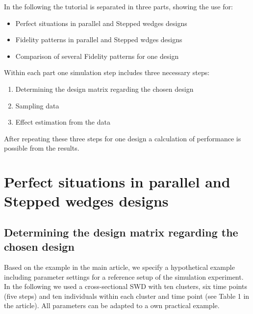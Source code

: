 \documentclass{article}\usepackage[]{graphicx}\usepackage[]{color}
\begin{document}
In the following the tutorial is separated in three parts, showing the use for:

\begin{itemize}
\item Perfect situations in parallel and Stepped wedges designs
\item Fidelity patterns in parallel and Stepped wdges designs
\item Comparison of several Fidelity patterns for one design
\end{itemize}

Within each part one simulation step includes three necessary steps:

\begin{enumerate}
\item Determining the design matrix regarding the chosen design
\item Sampling data
\item Effect estimation from the data
\end{enumerate}
After repeating these three steps for one design a calculation of performance is possible from the results.






\section{Perfect situations in parallel and Stepped wedges designs}

\subsection{Determining the design matrix regarding the chosen design}

Based on the example in the main article, we specify a hypothetical example including parameter settings for a reference setup of the simulation experiment. In the following we used a cross-sectional SWD with ten clusters, six time points (five steps) and ten individuals within each cluster and time point (see Table 1 in the article). All parameters can be adapted to a own practical example.
\end{document}
